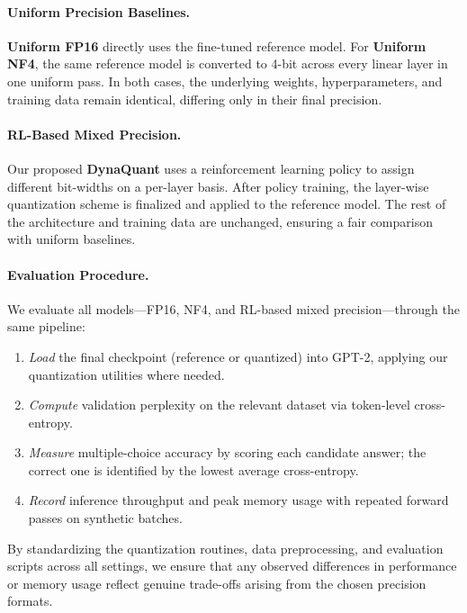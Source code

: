 \documentclass{article}
\begin{document}
	\paragraph{Uniform Precision Baselines.}
	\textbf{Uniform FP16} directly uses the fine-tuned reference model. For \textbf{Uniform NF4}, the same reference model is converted to 4-bit across every linear layer in one uniform pass. In both cases, the underlying weights, hyperparameters, and training data remain identical, differing only in their final precision.
	
	\paragraph{RL-Based Mixed Precision.}
	Our proposed \textbf{DynaQuant} uses a reinforcement learning policy to assign different bit-widths on a per-layer basis. After policy training, the layer-wise quantization scheme is finalized and applied to the reference model. The rest of the architecture and training data are unchanged, ensuring a fair comparison with uniform baselines.
	
	\paragraph{Evaluation Procedure.}
	We evaluate all models---FP16, NF4, and RL-based mixed precision---through the same pipeline:
	\begin{enumerate}
		\item \emph{Load} the final checkpoint (reference or quantized) into GPT-2, applying our quantization utilities where needed.
		\item \emph{Compute} validation perplexity on the relevant dataset via token-level cross-entropy.
		\item \emph{Measure} multiple-choice accuracy by scoring each candidate answer; the correct one is identified by the lowest average cross-entropy.
		\item \emph{Record} inference throughput and peak memory usage with repeated forward passes on synthetic batches.
	\end{enumerate}
	
	By standardizing the quantization routines, data preprocessing, and evaluation scripts across all settings, we ensure that any observed differences in performance or memory usage reflect genuine trade-offs arising from the chosen precision formats.
	
	
\end{document}
